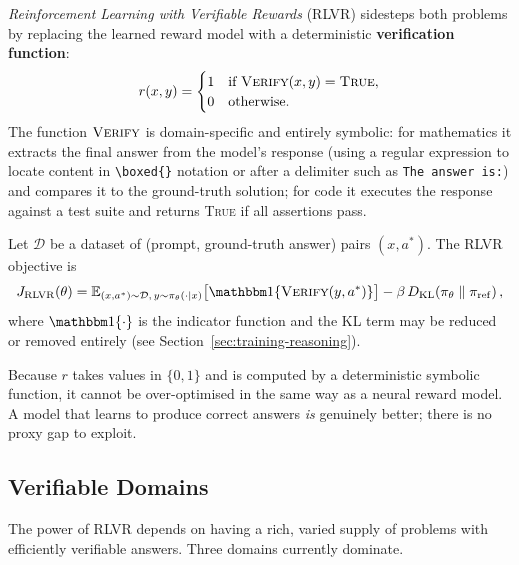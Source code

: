 \emph{Reinforcement Learning with Verifiable Rewards} (RLVR) sidesteps
both problems by replacing the learned reward model with a deterministic
\textbf{verification function}:
\begin{equation}
\label{eq:rlvr-reward-ch15}
r(x, y) = \begin{cases}
  1 & \text{if } \textsc{Verify}(x, y) = \textsc{True}, \\
  0 & \text{otherwise.}
\end{cases}
\end{equation}
The function $\textsc{Verify}$ is domain-specific and entirely
symbolic: for mathematics it extracts the final answer from the
model's response (using a regular expression to locate content in
\texttt{\textbackslash boxed\{\}} notation or after a delimiter such
as \texttt{The answer is:}) and compares it to the ground-truth
solution; for code it executes the response against a test suite and
returns \textsc{True} if all assertions pass.

\begin{definition}
\label{def:rlvr-ch15}
Let $\mathcal{D}$ be a dataset of (prompt, ground-truth answer) pairs
$(x, a^*)$. The RLVR objective is
\begin{equation}
\label{eq:rlvr-objective}
J_{\mathrm{RLVR}}(\theta)
  = \E_{(x,a^*)\sim\mathcal{D},\,y\sim\pi_\theta(\cdot|x)}
    \bigl[\ind\{\textsc{Verify}(y, a^*)\}\bigr]
  - \beta\,\KL{\pi_\theta}{\pi_{\mathrm{ref}}},
\end{equation}
where $\ind\{\cdot\}$ is the indicator function and the KL term may
be reduced or removed entirely (see Section~\ref{sec:training-reasoning}).
\end{definition}

Because $r$ takes values in $\{0, 1\}$ and is computed by a
deterministic symbolic function, it cannot be over-optimised in the
same way as a neural reward model. A model that learns to produce
correct answers \emph{is} genuinely better; there is no proxy gap to
exploit.

\subsection{Verifiable Domains}
\label{subsec:verifiable-domains}

The power of RLVR depends on having a rich, varied supply of problems
with efficiently verifiable answers. Three domains currently dominate.

